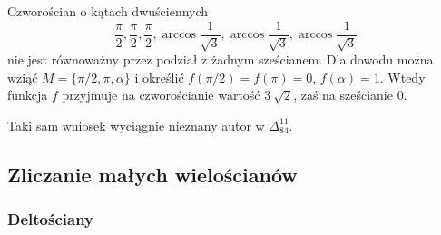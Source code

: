 \begin{corollary}
    Czworościan o kątach dwuściennych
    \begin{equation}
        \frac \pi 2, \frac \pi 2, \frac \pi 2,
        \arccos \frac{1}{\sqrt 3}, \arccos \frac{1}{\sqrt 3}, \arccos \frac{1}{\sqrt 3}
    \end{equation}
    nie jest równoważny przez podział z żadnym sześcianem.
    Dla dowodu można wziąć $M = \{\pi/2, \pi, \alpha\}$ i określić $f(\pi/2) = f(\pi) = 0$, $f(\alpha) = 1$.
    Wtedy funkcja $f$ przyjmuje na czworościanie wartość $3 \ \sqrt 2$, zaś na sześcianie $0$.
\end{corollary}

Taki sam wniosek wyciągnie nieznany autor w $\Delta_{84}^{11}$.


\subsection{Zliczanie małych wielościanów}
\subsubsection{Deltościany}

